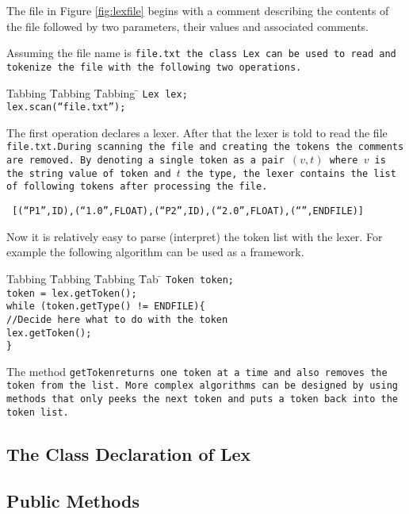 The file in Figure \ref{fig:lexfile} begins with a comment describing
the contents of the file followed by two parameters, their values
and associated comments.
 
Assuming the file name is \tt file.txt \rm the class \tt Lex \rm can 
be used to read and tokenize the file
with the following two operations.

\begin{tabbing}
Tabbing \= Tabbing \= Tabbing \= \kill
\>\>\>\tt Lex lex; \\
\>\>\>\tt lex.scan(``file.txt'');
\end{tabbing}

The first operation declares a lexer. After that the lexer is
told to read the file \tt file.txt.\rm During scanning the file     
and creating the tokens the comments are removed. By denoting a single token 
as a pair $(v,t)$ where $v$ is the string value of token and $t$ the type,
the lexer contains the list of following tokens after processing the file.
\begin{center}
\tt 
[(``P1'',ID),(``1.0'',FLOAT),(``P2'',ID),(``2.0'',FLOAT),(``'',ENDFILE)]
\rm
\end{center}

Now it is relatively easy to parse (interpret) the token list 
with the lexer. For example the following algorithm can be used 
as a framework.

\begin{tabbing}
Tabbing \= Tabbing \= Tabbing \= Tab \= \kill
\>\>\>\tt Token token; \\
\>\>\>\tt token = lex.getToken(); \\  
\>\>\>\tt while (token.getType() != ENDFILE)\{\\
\>\>\>\>\tt //Decide here what to do with the token\\
\>\>\>\>\tt lex.getToken();\\
\>\>\>\tt \}
\end{tabbing}

The method \tt getToken\rm returns one token at a time and
also removes the token from the list. More complex algorithms can
be designed by using methods that only peeks the next token
and puts a token back into the token list.

\subsection{The Class Declaration of Lex}

\subsection{Public Methods}

